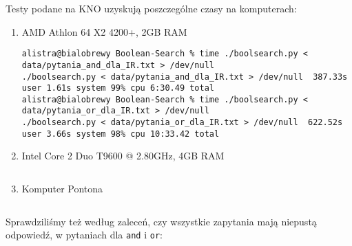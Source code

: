 \documentclass[11pt]{article}
\begin{document}
Testy podane na KNO uzyskują poszczególne czasy na komputerach:
\begin{enumerate}
\item AMD Athlon 64 X2 4200+, 2GB RAM
\begin{verbatim}
alistra@bialobrewy Boolean-Search % time ./boolsearch.py < data/pytania_and_dla_IR.txt > /dev/null
./boolsearch.py < data/pytania_and_dla_IR.txt > /dev/null  387.33s user 1.61s system 99% cpu 6:30.49 total
alistra@bialobrewy Boolean-Search % time ./boolsearch.py < data/pytania_or_dla_IR.txt > /dev/null
./boolsearch.py < data/pytania_or_dla_IR.txt > /dev/null  622.52s user 3.66s system 98% cpu 10:33.42 total
\end{verbatim}
\item Intel Core 2 Duo T9600 @ 2.80GHz, 4GB RAM
\begin{verbatim}
\end{verbatim}
\item Komputer Pontona
\begin{verbatim}
\end{verbatim}
\end{enumerate}

Sprawdziliśmy też według zaleceń, czy wszystkie zapytania mają niepustą odpowiedź, w pytaniach dla \texttt{and} i \texttt{or}:
\begin{verbatim}
\end{verbatim}
\end{document}
